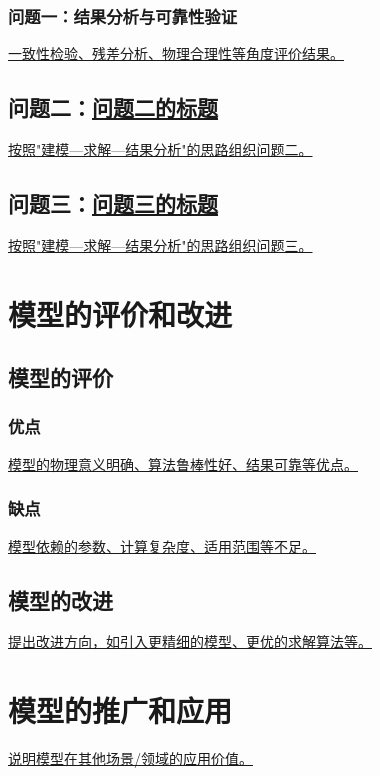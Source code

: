 \documentclass[a4paper,12pt]{article}
\begin{document}
\subsubsection{问题一：结果分析与可靠性验证}
\underline{一致性检验、残差分析、物理合理性等角度评价结果。}

\subsection{问题二：\underline{问题二的标题}}
\underline{按照"建模—求解—结果分析"的思路组织问题二。}

\subsection{问题三：\underline{问题三的标题}}
\underline{按照"建模—求解—结果分析"的思路组织问题三。}

\section{模型的评价和改进}

\subsection{模型的评价}
\subsubsection{优点}
\underline{模型的物理意义明确、算法鲁棒性好、结果可靠等优点。}

\subsubsection{缺点}
\underline{模型依赖的参数、计算复杂度、适用范围等不足。}

\subsection{模型的改进}
\underline{提出改进方向，如引入更精细的模型、更优的求解算法等。}

\section{模型的推广和应用}
\underline{说明模型在其他场景/领域的应用价值。}


\end{document}
